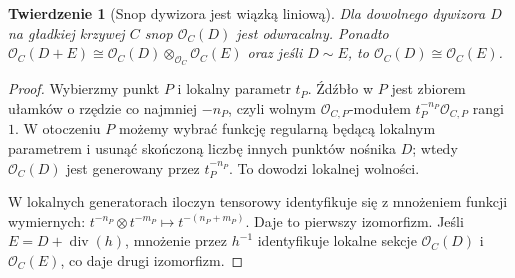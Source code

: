 \documentclass[11pt,a4paper,openany]{report}
\numberwithin{equation}{section}
\theoremstyle{plain}
\newtheorem{twierdzenie}{Twierdzenie}[section]
\theoremstyle{definition}
\theoremstyle{remark}
\begin{document}
\begin{twierdzenie}[Snop dywizora jest wiązką liniową]
\label{tw:O-D-invertible}
Dla dowolnego dywizora $D$ na gładkiej krzywej $C$
snop $\mathcal O_C(D)$ jest odwracalny.
Ponadto $\mathcal O_C(D+E)\cong
\mathcal O_C(D)\otimes_{\mathcal O_C}\mathcal O_C(E)$
oraz jeśli $D\sim E$, to
$\mathcal O_C(D)\cong\mathcal O_C(E)$.
\end{twierdzenie}
\begin{proof}
Wybierzmy punkt $P$ i lokalny parametr $t_P$.
Źdźbło w $P$ jest zbiorem ułamków o rzędzie
co najmniej $-n_P$, czyli wolnym
$\mathcal O_{C,P}$-modułem $t_P^{-n_P}\mathcal O_{C,P}$
rangi $1$. W otoczeniu $P$ możemy wybrać
funkcję regularną będącą lokalnym parametrem
i usunąć skończoną liczbę innych punktów nośnika
$D$; wtedy $\mathcal O_C(D)$ jest generowany
przez $t_P^{-n_P}$. To dowodzi lokalnej wolności.

W lokalnych generatorach iloczyn tensorowy
identyfikuje się z mnożeniem funkcji wymiernych:
$t^{-n_P}\otimes t^{-m_P}\mapsto t^{-(n_P+m_P)}$.
Daje to pierwszy izomorfizm. Jeśli
$E=D+\operatorname{div}(h)$, mnożenie przez
$h^{-1}$ identyfikuje lokalne sekcje
$\mathcal O_C(D)$ i $\mathcal O_C(E)$,
co daje drugi izomorfizm.
\end{proof}
\end{document}
